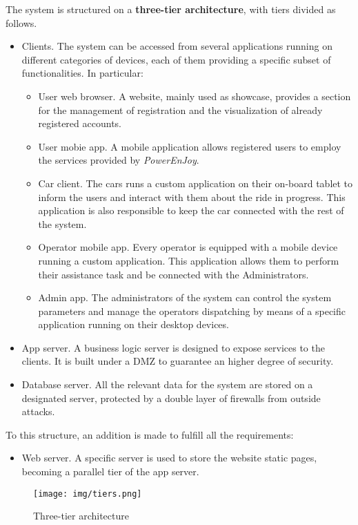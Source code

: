 The system is structured on a \textbf{three-tier architecture}, with tiers divided as follows.
\begin{itemize}
	\item{Clients.} The system can be accessed from several applications running on different categories of devices, each of them providing a specific subset of functionalities. In particular:
	\begin{itemize}
		\item{User web browser.} A website, mainly used as showcase, provides a section for the management of registration and the visualization of already registered accounts.
		\item{User mobie app.} A mobile application allows registered users to employ the services provided by \textit{PowerEnJoy}.
		\item{Car client.} The cars runs a custom application on their on-board tablet to inform the users and interact with them about the ride in progress. This application is also responsible to keep the car connected with the rest of the system.
		\item{Operator mobile app.} Every operator is equipped with a mobile device running a custom application. This application allows them to perform their assistance task and be connected with the Administrators.
		\item{Admin app.} The administrators of the system can control the system parameters and manage the operators dispatching by means of a specific application running on their desktop devices.
	\end{itemize}
	\item{App server.} A business logic server is designed to expose services to the clients. It is built under a DMZ to guarantee an higher degree of security.
	\item{Database server.} All the relevant data for the system are stored on a designated server, protected by a double layer of firewalls from outside attacks.
\end{itemize}
To this structure, an addition is made to fulfill all the requirements:
	\begin{itemize}
		\item{Web server.} A specific server is used to store the website static pages, becoming a parallel tier of the app server.
	\end{itemize}

\begin{figure}[h]
	\texttt{[image: img/tiers.png]} %
	\caption{Three-tier architecture}
\end{figure}
\FloatBarrier

